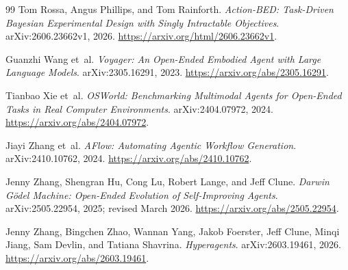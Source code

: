 \documentclass[11pt,letterpaper]{article}
\theoremstyle{remark}\newtheorem{remark}{Remark}[section]
\begin{document}
\begin{thebibliography}{99}
Tom Rossa, Angus Phillips, and Tom Rainforth. \emph{Action-BED: Task-Driven Bayesian Experimental Design with Singly Intractable Objectives}. arXiv:2606.23662v1, 2026. \url{https://arxiv.org/html/2606.23662v1}.

Guanzhi Wang et~al. \emph{Voyager: An Open-Ended Embodied Agent with Large Language Models}. arXiv:2305.16291, 2023. \url{https://arxiv.org/abs/2305.16291}.

Tianbao Xie et~al. \emph{OSWorld: Benchmarking Multimodal Agents for Open-Ended Tasks in Real Computer Environments}. arXiv:2404.07972, 2024. \url{https://arxiv.org/abs/2404.07972}.

Jiayi Zhang et~al. \emph{AFlow: Automating Agentic Workflow Generation}. arXiv:2410.10762, 2024. \url{https://arxiv.org/abs/2410.10762}.

Jenny Zhang, Shengran Hu, Cong Lu, Robert Lange, and Jeff Clune. \emph{Darwin G\"odel Machine: Open-Ended Evolution of Self-Improving Agents}. arXiv:2505.22954, 2025; revised March 2026. \url{https://arxiv.org/abs/2505.22954}.

Jenny Zhang, Bingchen Zhao, Wannan Yang, Jakob Foerster, Jeff Clune, Minqi Jiang, Sam Devlin, and Tatiana Shavrina. \emph{Hyperagents}. arXiv:2603.19461, 2026. \url{https://arxiv.org/abs/2603.19461}.
\end{thebibliography}
\end{document}
